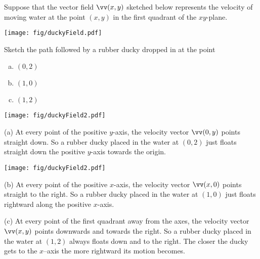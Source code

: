 



\begin{question}
Suppose that the vector field $\vv(x,y)$ sketched below represents the velocity of 
moving water at the point $(x,y)$ in the first quadrant of the $xy$-plane.
  \begin{center}
       \texttt{[image: fig/duckyField.pdf]}
  \end{center}
Sketch the path followed by a rubber ducky dropped in at the point
\begin{enumerate}[(a)]
\item $(0,2)$
\item $(1,0)$
\item $(1,2)$
\end{enumerate}
\end{question}


\begin{answer} 
\begin{center}
       \texttt{[image: fig/duckyField2.pdf]}
  \end{center}
\end{answer}

\begin{solution}
(a) At every point of the positive $y$-axis, the velocity vector $\vv(0,y)$
points straight down. So a rubber ducky placed in the water at $(0,2)$
just floats straight down the positive $y$-axis towards the origin.

\begin{center}
       \texttt{[image: fig/duckyField2.pdf]}
  \end{center}

\noindent
(b) At every point of the positive $x$-axis, the velocity vector $\vv(x,0)$
points straight to the right. So a rubber ducky placed in the water at $(1,0)$
just floats rightward along the positive $x$-axis.

\noindent
(c) At every point of the first quadrant away from the axes, the 
velocity vector $\vv(x,y)$ points downwards and towards the right. So a 
rubber ducky placed in the water at $(1,2)$ always floats down and to 
the right. The closer the ducky gets to the $x$--axis the more rightward 
its motion becomes. 

\end{solution}



